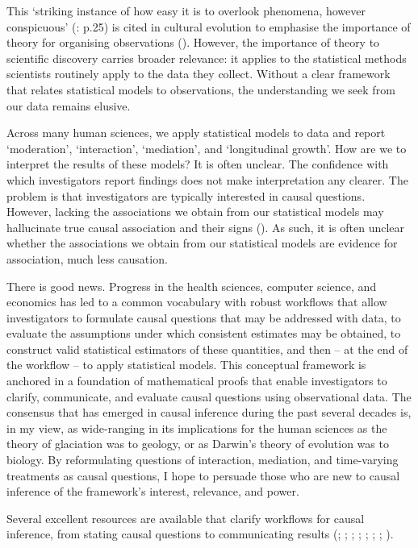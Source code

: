 \documentclass[
  single column]{article}
\begin{document}
This `striking instance of how easy it is to overlook phenomena, however
conspicuous' (: p.25) is cited
in cultural evolution to emphasise the importance of theory for
organising observations (). However, the importance of theory to scientific discovery
carries broader relevance: it applies to the statistical methods
scientists routinely apply to the data they collect. Without a clear
framework that relates statistical models to observations, the
understanding we seek from our data remains elusive.

Across many human sciences, we apply statistical models to data and
report `moderation', `interaction', `mediation', and `longitudinal
growth'. How are we to interpret the results of these models? It is
often unclear. The confidence with which investigators report findings
does not make interpretation any clearer. The problem is that
investigators are typically interested in causal questions. However,
lacking the associations we obtain from our statistical models may
hallucinate true causal association and their signs
(). As such,
it is often unclear whether the associations we obtain from our
statistical models are evidence for association, much less causation.

There is good news. Progress in the health sciences, computer science,
and economics has led to a common vocabulary with robust workflows that
allow investigators to formulate causal questions that may be addressed
with data, to evaluate the assumptions under which consistent estimates
may be obtained, to construct valid statistical estimators of these
quantities, and then -- at the end of the workflow -- to apply
statistical models. This conceptual framework is anchored in a
foundation of mathematical proofs that enable investigators to clarify,
communicate, and evaluate causal questions using observational data. The
consensus that has emerged in causal inference during the past several
decades is, in my view, as wide-ranging in its implications for the
human sciences as the theory of glaciation was to geology, or as
Darwin's theory of evolution was to biology. By reformulating questions
of interaction, mediation, and time-varying treatments as causal
questions, I hope to persuade those who are new to causal inference of
the framework's interest, relevance, and power.

Several excellent resources are available that clarify workflows for
causal inference, from stating causal questions to communicating results
(;
;
;
;
;
; ; ).
\end{document}
